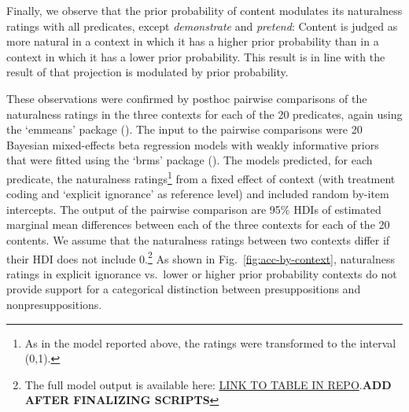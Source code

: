 \documentclass[11pt,fleqn]{article}
\newcommand{\6}{\mbox{$[\hspace*{-.6mm}[$}}
\newcommand{\9}{\mbox{$]\hspace*{-.6mm}]$}}
\begin{document}
Finally, we observe that the prior probability of content modulates its naturalness ratings with all predicates, except {\em demonstrate} and {\em pretend}: Content is judged as more natural in a context in which it has a higher prior probability than in a context in which it has a lower prior probability. This result is in line with the result of \citealt{degen-tonhauser-openmind} that projection is modulated by prior probability.

These observations were confirmed by posthoc pairwise comparisons of the naturalness ratings in the three contexts for each of the 20 predicates, again using the `emmeans' package (\citealt{emmeans}). The input to the pairwise comparisons were 20 Bayesian mixed-effects beta regression models with weakly informative priors that were fitted using the `brms' package (\citealt{buerkner2017}). The models predicted, for each predicate, the naturalness ratings\footnote{As in the model reported above, the ratings were transformed to the interval (0,1).} from a fixed effect of context (with treatment coding and `explicit ignorance' as reference level) and included random by-item intercepts. The output of the pairwise comparison are 95\% HDIs of estimated marginal mean differences between each of the three contexts for each of the 20 contents. We assume that the naturalness ratings between two contexts differ if their HDI does not include 0.\footnote{The full model output is available here: \url{LINK TO TABLE IN REPO}.{\bf ADD AFTER FINALIZING SCRIPTS}} As shown in Fig.~\ref{fig:acc-by-context}, naturalness ratings in explicit ignorance vs.\ lower or higher prior probability contexts do not provide support for a categorical distinction between presuppositions and nonpresuppositions.
\end{document}

